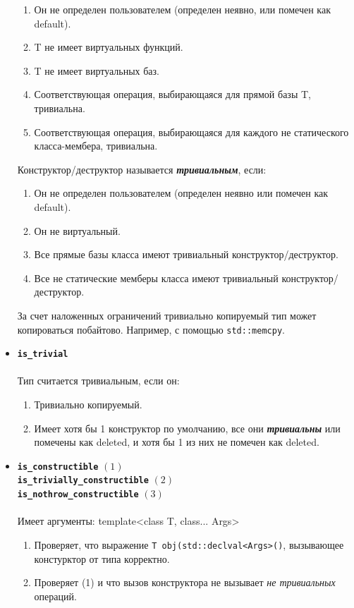 \begin{itemize}
\begin{enumerate} 
\item Он не определен пользователем (определен неявно, или помечен как default).
\item T не имеет виртуальных функций.
\item T не имеет виртуальных баз.
\item Соответствующая операция, выбирающаяся для прямой базы T, тривиальна.
\item Соответствующая операция, выбирающаяся для каждого не статического класса-мембера, тривиальна.
\end{enumerate}
Конструктор/деструктор называется \textbf{\textit{тривиальным}}, если:
\begin{enumerate}
	\item Он не определен пользователем (определен неявно или помечен как default).
	\item Он не виртуальный.
	\item Все прямые базы класса имеют тривиальный конструктор/деструктор.
	\item Все не статические мемберы класса имеют тривиальный конструктор/деструктор.
\end{enumerate}
За счет наложенных ограничений тривиально копируемый тип может копироваться побайтово. Например, с помощью \texttt{std::memcpy}.
\item \textbf{\texttt{is\_trivial}} \\\\
Тип считается тривиальным, если он:
\begin{enumerate}
\item Тривиально копируемый.
\item Имеет хотя бы 1 конструктор по умолчанию, все они \textbf{\textit{тривиальны}} или помечены как deleted,
и хотя бы 1 из них не помечен как deleted.
\end{enumerate}
\item \texttt{\textbf{is\_constructible}} $(1)$\\
		\texttt{\textbf{is\_trivially\_constructible}} $(2)$\\
		\texttt{\textbf{is\_nothrow\_constructible}} $(3)$\\\\
Имеет аргументы: template<class T, class... Args>
\begin{enumerate}
\item Проверяет, что выражение \texttt{T obj(std::declval<Args>()}, вызывающее констурктор от типа корректно.
\item Проверяет (1) и что вызов конструктора не вызывает \textit{не тривиальных} операций.

\end{enumerate}
\end{itemize}
